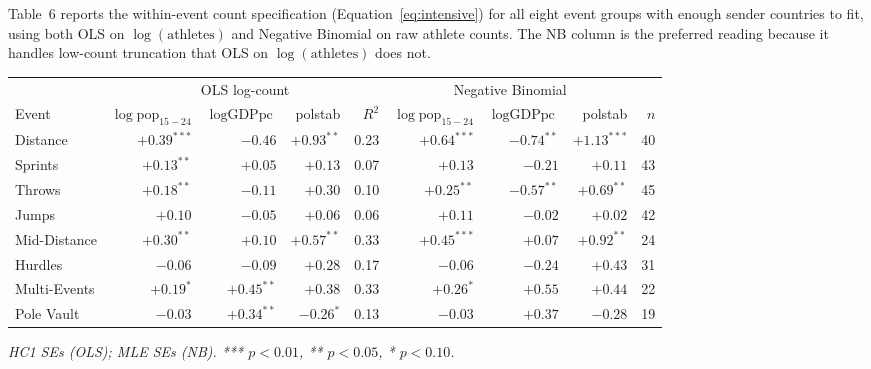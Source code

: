 \documentclass[11pt]{article}
\begin{document}
Table~6 reports the within-event count specification
(Equation~\ref{eq:intensive}) for all eight event groups with enough
sender countries to fit, using both OLS on $\log(\text{athletes})$
and Negative Binomial on raw athlete counts. The NB column is the
preferred reading because it handles low-count truncation that OLS
on $\log(\text{athletes})$ does not.

\begin{center}
\footnotesize
\begin{tabular}{lrrrrrrrr}
\toprule
            & \multicolumn{4}{c}{OLS log-count} & \multicolumn{3}{c}{Negative Binomial} & \\
\cmidrule(lr){2-5} \cmidrule(lr){6-8}
Event       & $\log\text{pop}_{15-24}$ & $\log\text{GDPpc}$ & polstab & $R^2$ & $\log\text{pop}_{15-24}$ & $\log\text{GDPpc}$ & polstab & $n$ \\
\midrule
Distance     & $+0.39^{***}$ & $-0.46$       & $+0.93^{**}$ & 0.23 & $\mathbf{+0.64^{***}}$ & $\mathbf{-0.74^{**}}$ & $\mathbf{+1.13^{***}}$ & 40 \\
Sprints      & $+0.13^{**}$  & $+0.05$       & $+0.13$       & 0.07 & $+0.13$                & $-0.21$               & $+0.11$               & 43 \\
Throws       & $+0.18^{**}$  & $-0.11$       & $+0.30$       & 0.10 & $\mathbf{+0.25^{**}}$  & $\mathbf{-0.57^{**}}$ & $\mathbf{+0.69^{**}}$  & 45 \\
Jumps        & $+0.10$       & $-0.05$       & $+0.06$       & 0.06 & $+0.11$                & $-0.02$               & $+0.02$               & 42 \\
Mid-Distance & $+0.30^{**}$  & $+0.10$       & $+0.57^{**}$  & 0.33 & $\mathbf{+0.45^{***}}$ & $+0.07$                & $\mathbf{+0.92^{**}}$  & 24 \\
Hurdles      & $-0.06$       & $-0.09$       & $+0.28$       & 0.17 & $-0.06$                & $-0.24$               & $+0.43$               & 31 \\
Multi-Events & $+0.19^{*}$   & $+0.45^{**}$  & $+0.38$       & 0.33 & $+0.26^{*}$            & $+0.55$                & $+0.44$               & 22 \\
Pole Vault   & $-0.03$       & $+0.34^{**}$  & $-0.26^{*}$   & 0.13 & $-0.03$                & $+0.37$                & $-0.28$               & 19 \\
\bottomrule
\end{tabular}
\end{center}
{\footnotesize\itshape HC1 SEs (OLS); MLE SEs (NB). *** $p<0.01$, ** $p<0.05$, * $p<0.10$.}
\end{document}
